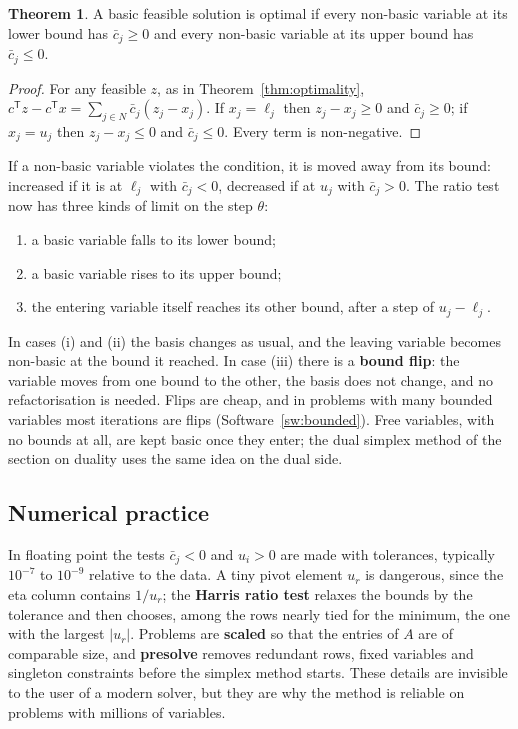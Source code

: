 \documentclass[11pt,a4paper]{article}
\numberwithin{equation}{section}
\theoremstyle{definition}
\newtheorem{thm}{Theorem}[subsection]
\begin{document}
\begin{thm}
\label{thm:boundedopt}
A basic feasible solution is optimal if every non-basic variable at its lower bound has $\bar c_j \geq 0$ and every non-basic variable at its upper bound has $\bar c_j \leq 0$.
\end{thm}

\begin{proof}
For any feasible $z$, as in Theorem~\ref{thm:optimality}, $c^{\mathsf T}z - c^{\mathsf T}x = \sum_{j \in N}\bar c_j(z_j - x_j)$. If $x_j = \ell_j$ then $z_j - x_j \geq 0$ and $\bar c_j \geq 0$; if $x_j = u_j$ then $z_j - x_j \leq 0$ and $\bar c_j \leq 0$. Every term is non-negative.
\end{proof}

If a non-basic variable violates the condition, it is moved away from its bound: increased if it is at $\ell_j$ with $\bar c_j < 0$, decreased if at $u_j$ with $\bar c_j > 0$. The ratio test now has three kinds of limit on the step $\theta$:
\begin{enumerate}[label=(\roman*)]
\item a basic variable falls to its lower bound;
\item a basic variable rises to its upper bound;
\item the entering variable itself reaches its other bound, after a step of $u_j - \ell_j$.
\end{enumerate}
In cases (i) and (ii) the basis changes as usual, and the leaving variable becomes non-basic at the bound it reached. In case (iii) there is a \textbf{bound flip}: the variable moves from one bound to the other, the basis does not change, and no refactorisation is needed. Flips are cheap, and in problems with many bounded
variables most iterations are flips (Software~\ref{sw:bounded}). Free variables, with no bounds at all, are kept basic once they enter; the dual simplex method of the section on duality uses the same idea on the dual side.

\subsection{Numerical practice}
\label{ssec:numerical}

In floating point the tests $\bar c_j < 0$ and $u_i > 0$ are made with tolerances, typically $10^{-7}$ to $10^{-9}$ relative to the data. A tiny pivot element $u_r$ is dangerous, since the eta column contains $1/u_r$; the \textbf{Harris ratio test} relaxes the bounds by the tolerance and then chooses, among the rows
nearly tied for the minimum, the one with the largest $|u_r|$. Problems are \textbf{scaled} so that the entries of $A$ are of comparable size, and \textbf{presolve} removes redundant rows, fixed variables and singleton constraints before the simplex method starts. These details are invisible to the user of a modern
solver, but they are why the method is reliable on problems with millions of variables.
\end{document}
